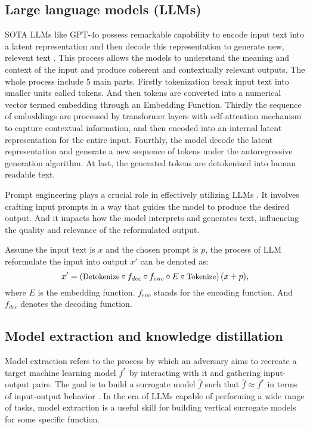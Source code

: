 \subsection{Large language models (LLMs) }SOTA LLMs like GPT-4o possess remarkable capability to encode input text into a latent representation and then decode this representation to generate new, relevent text \cite{GPT4}. This process allows the models to understand the meaning and context of the input and produce coherent and contextually relevant outputs.
The whole process include 5 main parts. Firstly tokenization break input text into smaller units called tokens. And then tokens are converted into a numerical vector termed embedding through an Embedding Function. Thirdly the sequence of embeddings are processed by transformer layers with self-attention mechanism to capture contextual information, and then  encoded into an internal latent representation for the entire input. Fourthly, the model decode the latent representation and generate a new sequence of tokens under the autoregressive generation algorithm. At last, the generated tokens are detokenized into human readable text.

Prompt engineering plays a crucial role in effectively utilizing LLMs \cite{prompt_engineering}. It involves crafting input prompts in a way that guides the model to produce the desired output. And it impacts how the model interprets and generates text, influencing the quality and relevance of the reformulated output.

Assume the input text is $x$ and the chosen prompt is $p$, the process of LLM reformulate the input into output $x'$ can be denoted as:
\begin{equation}
\small
x' = \left( \text{Detokenize} \circ f_{dec} \circ f_{enc} \circ E \circ \text{Tokenize} \right)(x+p),
\end{equation}
where $E$ is the embedding function.  $f_{enc}$ stands for the encoding function. And $f_{dec}$ denotes the decoding function.
\subsection{Model extraction and knowledge distillation}
Model extraction refers to the process by which an adversary aims to recreate a target machine learning model $f^*$ by interacting with it and gathering input-output pairs. The goal is to build a surrogate model $\hat{f}$ such that $\hat{f}\approx f^*$ in terms of input-output behavior \cite{mt1} \cite{mt2}. In the era of LLMs capable of performing a wide range of tasks, model extraction is a useful skill for building vertical surrogate models for some specific function.

